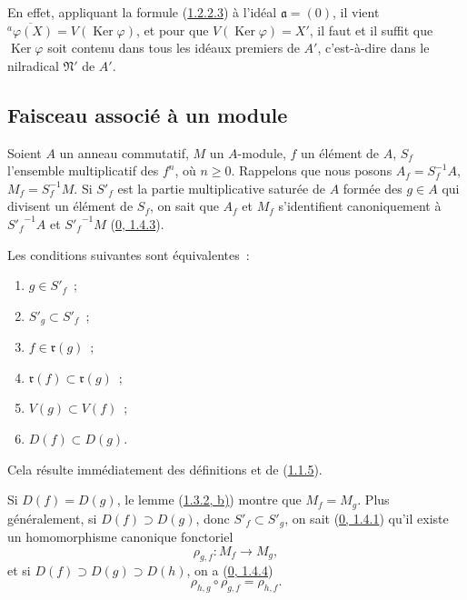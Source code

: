 En effet, appliquant la formule (\hyperref[I.1.2.2.3-fr]{1.2.2.3}) à l'idéal
$\mathfrak{a}=(0)$, il vient
$\overline{{}^a\varphi(X)}=V(\operatorname{Ker}\varphi)$, et pour que
$V(\operatorname{Ker}\varphi)=X'$, il faut et il suffit que
$\operatorname{Ker}\varphi$ soit contenu dans tous les idéaux premiers de
$A'$, c'est-à-dire dans le nilradical $\mathfrak{N}'$ de $A'$.

\subsection{Faisceau associé à un module}
\label{subsection:I.1.3-fr}
\label{I.1.3-fr}

\begin{env}[1.3.1]
\label{I.1.3.1-fr}
Soient $A$ un anneau commutatif, $M$ un $A$-module, $f$ un élément de $A$,
$S_f$ l'ensemble multiplicatif des $f^n$, où $n\geq0$. Rappelons que nous
posons $A_f=S_f^{-1}A$, $M_f=S_f^{-1}M$. Si $S'_f$ est la partie
multiplicative saturée de $A$ formée des $g\in A$ qui divisent un élément de
$S_f$, on sait que $A_f$ et $M_f$ s'identifient canoniquement à
${S'_f}^{-1}A$ et ${S'_f}^{-1}M$
(\hyperref[0.1.4.3-fr]{0, 1.4.3}).
\end{env}

\begin{lemma}[1.3.2]
\label{I.1.3.2-fr}
Les conditions suivantes sont équivalentes~:
\begin{enumerate}
  \item[\rm(a)] $g\in S'_f$~;
  \item[\rm(b)] $S'_g\subset S'_f$~;
  \item[\rm(c)] $f\in\mathfrak{r}(g)$~;
  \item[\rm(d)] $\mathfrak{r}(f)\subset\mathfrak{r}(g)$~;
  \item[\rm(e)] $V(g)\subset V(f)$~;
  \item[\rm(f)] $D(f)\subset D(g)$.
\end{enumerate}
\end{lemma}

Cela résulte immédiatement des définitions et de
(\hyperref[I.1.1.5-fr]{1.1.5}).

\begin{env}[1.3.3]
\label{I.1.3.3-fr}
Si $D(f)=D(g)$, le lemme (\hyperref[I.1.3.2-fr]{1.3.2, b)}) montre que
$M_f=M_g$. Plus généralement, si $D(f)\supset D(g)$, donc
$S'_f\subset S'_g$, on sait (\hyperref[0.1.4.1-fr]{0, 1.4.1}) qu'il existe un
homomorphisme canonique fonctoriel
\[
  \rho_{g,f}:M_f\longrightarrow M_g,
\]
et si $D(f)\supset D(g)\supset D(h)$, on a
(\hyperref[0.1.4.4-fr]{0, 1.4.4})
\begin{equation}
  \rho_{h,g}\circ\rho_{g,f}=\rho_{h,f}.
  \tag{1.3.3.1}\label{I.1.3.3.1-fr}
\end{equation}
\end{env}

